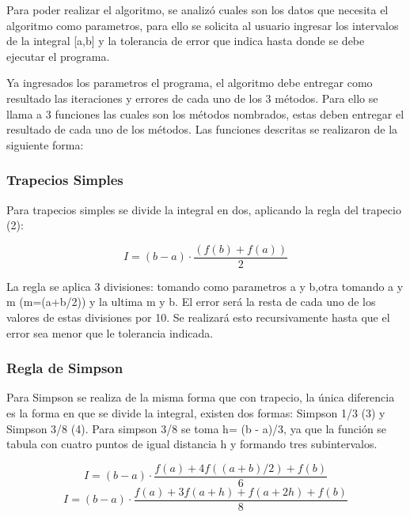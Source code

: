 \par Para poder realizar el algoritmo, se analizó cuales son los datos que necesita el algoritmo como parametros, para ello se solicita al usuario ingresar los intervalos de la integral [a,b] y la tolerancia de error que indica hasta donde se debe ejecutar el programa.

\par Ya ingresados los parametros el programa, el algoritmo debe entregar como resultado las iteraciones y errores de cada uno de los 3 métodos. Para ello se llama a 3 funciones las cuales son los métodos nombrados, estas deben entregar el resultado de cada uno de los métodos. Las funciones descritas se realizaron de la siguiente forma:

\subsubsection{Trapecios Simples}

\par Para trapecios simples se divide la integral en dos, aplicando la regla del trapecio (2):

\begin{equation}
	I = (b-a)\cdot\frac{(f(b) + f(a))}{2}
\end{equation}

\par La regla se aplica 3 divisiones: tomando como parametros a y b,otra tomando a y m (m=(a+b/2)) y la ultima m y b. El error será la resta de cada uno de los valores de estas divisiones por 10. Se realizará esto recursivamente hasta que el error sea menor que le tolerancia indicada.

\subsubsection{Regla de Simpson}

\par Para Simpson se realiza de la misma forma que con trapecio, la única diferencia es la forma en que se divide la integral, existen dos formas:  Simpson 1/3 (3) y Simpson 3/8 (4). Para simpson 3/8 se toma h= (b - a)/3, ya que la función se tabula con cuatro puntos de igual distancia h y formando tres subintervalos.

\begin{equation}
	I = (b-a)\cdot\frac{f(a)+ 4f((a+b)/2) + f(b)}{6}
\end{equation}
\begin{equation}
	I = (b-a)\cdot\frac{f(a)+ 3f(a+h) + f(a+2h) + f(b)}{8}
\end{equation}

